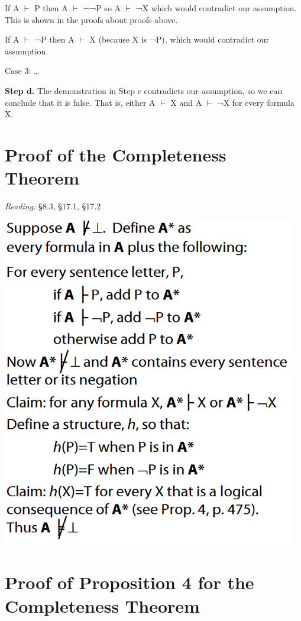 \documentclass[12pt]{extarticle}
\begin{document}
\begin{multicols*}{3}
\hspace{5mm} If A $\vdash$ P then A $\vdash$ ¬¬P so A $\vdash$ ¬X which would contradict our assumption. This is shown in the proofs about proofs above.
 
\hspace{5mm} If A $\vdash$ ¬P then A $\vdash$ X (because X is ¬P), which would contradict our assumption.
 
Case 3: …
 
\textbf{Step d.} The demonstration in Step c contradicts our assumption, so we can conclude that it is false. That is, either A $\vdash$ X and A $\vdash$ ¬X for every formula X.
 
 
 
\section{Proof of the Completeness Theorem}
 
\emph{Reading:} §8.3, §17.1, §17.2
 
\begin{center}
\includegraphics[scale=0.3]{img/unit_455_completeness.png}
\end{center}
 
 
\section{Proof of Proposition 4 for the Completeness Theorem}
 

\end{multicols*}
\end{document}
